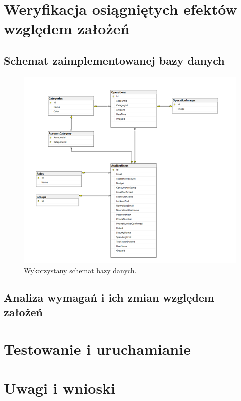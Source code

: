 \documentclass[12pt,a4paper,oneside]{article}
\begin{document}
\section{Weryfikacja osiągniętych efektów względem założeń}
\subsection{Schemat zaimplementowanej bazy danych}
\begin{figure}[H]
    \centering
    \includegraphics[width=\hsize,keepaspectratio]{images/DB2.png}
    \caption{Wykorzystany schemat bazy danych.}
\end{figure}

\subsection{Analiza wymagań i ich zmian względem założeń}


\section{Testowanie i uruchamianie}

\section{Uwagi i wnioski}
\end{document}
